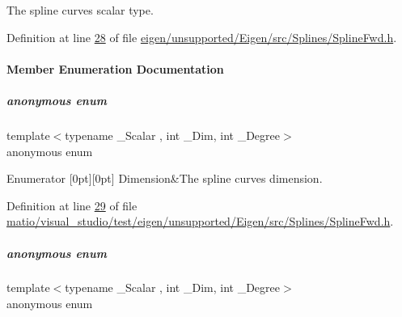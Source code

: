 The spline curve\textquotesingle{}s scalar type. 

Definition at line \hyperlink{eigen_2unsupported_2_eigen_2src_2_splines_2_spline_fwd_8h_source_l00028}{28} of file \hyperlink{eigen_2unsupported_2_eigen_2src_2_splines_2_spline_fwd_8h_source}{eigen/unsupported/\+Eigen/src/\+Splines/\+Spline\+Fwd.\+h}.



\paragraph{Member Enumeration Documentation}
\mbox{\label{group___splines___module_a93e7c03e3ea8088794fd8207404c94d7}} 
\subparagraph{\texorpdfstring{anonymous enum}{anonymous enum}}
{\footnotesize\ttfamily template$<$typename \+\_\+\+Scalar , int \+\_\+\+Dim, int \+\_\+\+Degree$>$ \\
anonymous enum}

\begin{DoxyEnumFields}{Enumerator}
[0pt][0pt]{}\mbox{\label{group___splines___module_a93e7c03e3ea8088794fd8207404c94d7adbafbfda2651866a881829e1aa7c918c}} 
Dimension&The spline curve\textquotesingle{}s dimension. \\
\hline

\end{DoxyEnumFields}


Definition at line \hyperlink{matio_2visual__studio_2test_2eigen_2unsupported_2_eigen_2src_2_splines_2_spline_fwd_8h_source_l00029}{29} of file \hyperlink{matio_2visual__studio_2test_2eigen_2unsupported_2_eigen_2src_2_splines_2_spline_fwd_8h_source}{matio/visual\+\_\+studio/test/eigen/unsupported/\+Eigen/src/\+Splines/\+Spline\+Fwd.\+h}.

\mbox{\label{group___splines___module_a2e06443a908d1ebf9cc91d4fa3fe5c5a}} 
\subparagraph{\texorpdfstring{anonymous enum}{anonymous enum}}
{\footnotesize\ttfamily template$<$typename \+\_\+\+Scalar , int \+\_\+\+Dim, int \+\_\+\+Degree$>$ \\
anonymous enum}


